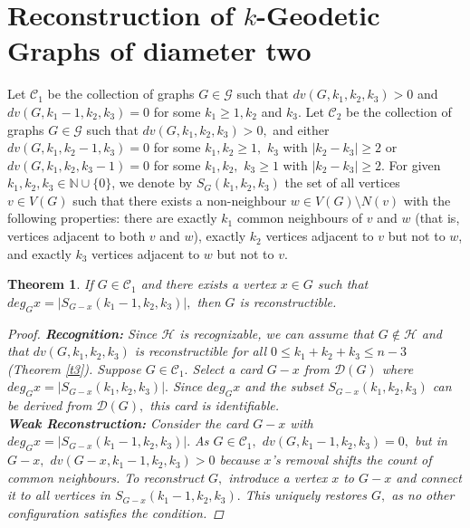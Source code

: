 \documentclass[11pt,oneside]{article}
\newtheorem{thm}{Theorem}
\theoremstyle{definition}
\begin{document}
\section{{ Reconstruction of $k$-Geodetic Graphs of diameter two}}

\indent {} Let $\mathscr{C}_1$ be the collection of graphs $G \in \mathcal{G}$ such that $dv(G,k_1,k_2,k_3) >0$ and $dv(G,k_{1}-1,k_{2},k_{3}) =0$ for some $k_1 \geq 1, k_2$ and $k_3.$  Let $\mathscr{C}_2$ be the collection of graphs $G \in \mathcal{G}$ such that $dv(G,k_1,k_2,k_3) >0,$ and either $dv(G,k_{1},k_{2}-1,k_{3}) =0$ for some $k_1, k_2 \geq 1,$ $k_3 $ with $|k_2-k_3| \geq 2$ or $dv(G,k_{1},k_{2},k_{3}-1) =0$ for some $k_1, k_2 ,$ $k_3 \geq 1$ with $|k_2-k_3| \geq 2.$ For given $k_1, k_2, k_3 \in \mathbb{N}\cup\{0\}$, we denote by $S_G(k_1, k_2, k_3)$ the set of all vertices $v \in V(G)$ such that there exists a non-neighbour $w \in V(G) \setminus N(v)$ with the following properties: there are exactly $k_1$ common neighbours of $v$ and $w$ (that is, vertices adjacent to both $v$ and $w$), exactly $k_2$ vertices adjacent to $v$ but not to $w$, and exactly $k_3$ vertices adjacent to $w$ but not to $v$. 

\begin{thm}\label{t7}
If $G \in \mathscr{C}_1$ and there exists a vertex $x \in G$ such that $deg_{G}x=|S_{G-x}(k_1-1,k_2,k_3)|,$ then $G$ is reconstructible.
\begin{proof}
\textbf{Recognition:} Since $\mathscr{H}$ is recognizable, we can assume that $G \notin \mathscr{H}$ and that $dv(G,k_1,k_2,k_3)$ is reconstructible for all $0 \leq k_1+k_2+k_3 \leq n-3$ (Theorem \ref{t3}). Suppose $G \in \mathscr{C}_{1}.$ Select a card $G-x$ from $\mathscr{D}(G)$ where $deg_{G}x= |S_{G-x}(k_1,k_2,k_3)|.$ Since $deg_{G}x$ and the  subset $S_{G-x}(k_1,k_2,k_3)$ can be derived from $\mathscr{D}(G),$ this card is identifiable.\\
\textbf{Weak Reconstruction:} Consider the card  $G-x$ with  $deg_{G}x= |S_{G-x}(k_1-1,k_2,k_3)|.$ As $G \in \mathscr{C}_{1},$  $dv(G,k_1-1,k_2,k_3)=0,$ but in $G-x,$ $dv(G-x,k_1-1,k_2,k_3)>0$ because $x$'s  removal shifts the count of common neighbours. To reconstruct $G,$ introduce a vertex $x$ to $G-x$ and connect it to all vertices in $S_{G-x}(k_1-1,k_2,k_3).$ This uniquely restores $G,$ as no other configuration satisfies the condition.
\end{proof}
\end{thm}
\end{document}
